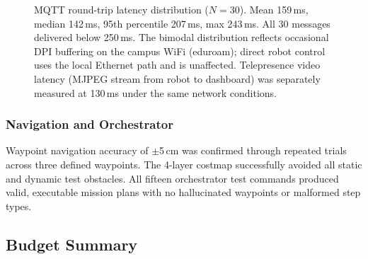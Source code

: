 \begin{figure}[H]
\centering
{}
\caption{MQTT round-trip latency distribution ($N=30$). Mean 159\,ms, median 142\,ms, 95th percentile 207\,ms, max 243\,ms. All 30 messages delivered below 250\,ms. The bimodal distribution reflects occasional DPI buffering on the campus WiFi (eduroam); direct robot control uses the local Ethernet path and is unaffected. Telepresence video latency (MJPEG stream from robot to dashboard) was separately measured at 130\,ms under the same network conditions.}
\label{fig:mqtt_hist}
\end{figure}

\subsubsection{Navigation and Orchestrator}

Waypoint navigation accuracy of $\pm$5\,cm was confirmed through repeated trials across three defined waypoints. The 4-layer costmap successfully avoided all static and dynamic test obstacles. All fifteen orchestrator test commands produced valid, executable mission plans with no hallucinated waypoints or malformed step types.

\subsection{Budget Summary}

